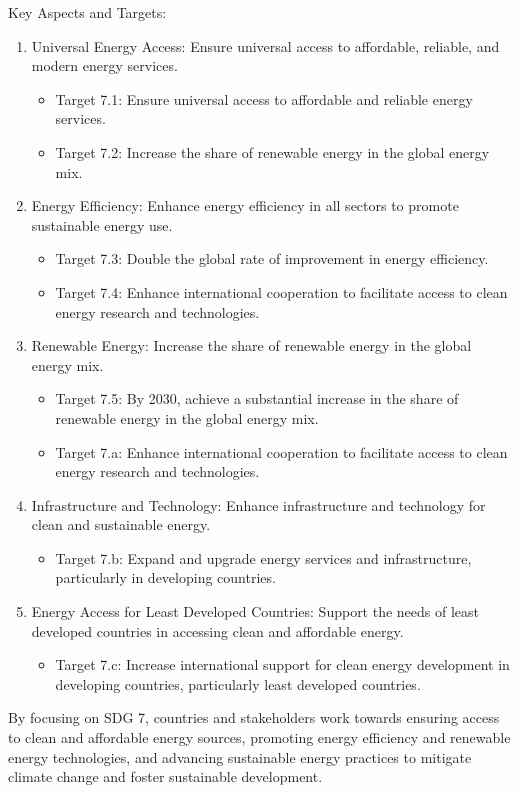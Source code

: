 \documentclass{article}
\begin{document}
Key Aspects and Targets:
\begin{enumerate}
    \item Universal Energy Access: Ensure universal access to affordable, reliable, and modern energy services.
    \begin{itemize}
        \item Target 7.1: Ensure universal access to affordable and reliable energy services.
        \item Target 7.2: Increase the share of renewable energy in the global energy mix.
    \end{itemize}
    \item Energy Efficiency: Enhance energy efficiency in all sectors to promote sustainable energy use.
    \begin{itemize}
        \item Target 7.3: Double the global rate of improvement in energy efficiency.
        \item Target 7.4: Enhance international cooperation to facilitate access to clean energy research and technologies.
    \end{itemize}
    \item Renewable Energy: Increase the share of renewable energy in the global energy mix.
    \begin{itemize}
        \item Target 7.5: By 2030, achieve a substantial increase in the share of renewable energy in the global energy mix.
        \item Target 7.a: Enhance international cooperation to facilitate access to clean energy research and technologies.
    \end{itemize}
    \item Infrastructure and Technology: Enhance infrastructure and technology for clean and sustainable energy.
    \begin{itemize}
        \item Target 7.b: Expand and upgrade energy services and infrastructure, particularly in developing countries.
    \end{itemize}
    \item Energy Access for Least Developed Countries: Support the needs of least developed countries in accessing clean and affordable energy.
    \begin{itemize}
        \item Target 7.c: Increase international support for clean energy development in developing countries, particularly least developed countries.
    \end{itemize}
\end{enumerate}
By focusing on SDG 7, countries and stakeholders work towards ensuring access to clean and affordable energy sources, promoting energy efficiency and renewable energy technologies, and advancing sustainable energy practices to mitigate climate change and foster sustainable development.
\end{document}
